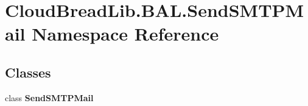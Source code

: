\hypertarget{namespace_cloud_bread_lib_1_1_b_a_l_1_1_send_s_m_t_p_mail}{}\section{Cloud\+Bread\+Lib.\+B\+A\+L.\+Send\+S\+M\+T\+P\+Mail Namespace Reference}
\label{namespace_cloud_bread_lib_1_1_b_a_l_1_1_send_s_m_t_p_mail}
\subsection*{Classes}
\begin{DoxyCompactItemize}
\item 
class {\bfseries Send\+S\+M\+T\+P\+Mail}
\end{DoxyCompactItemize}
